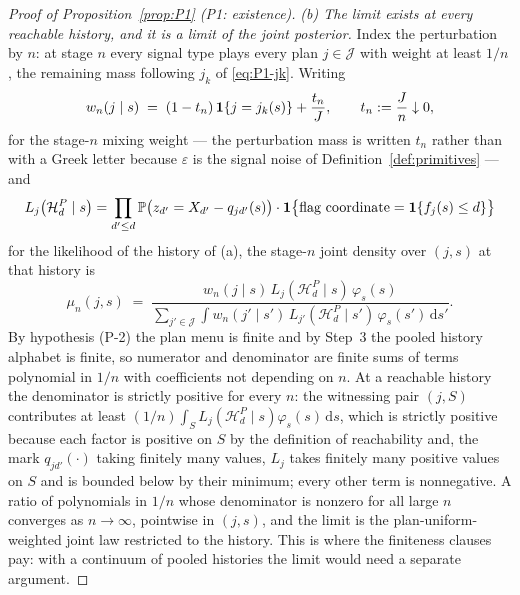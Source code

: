 \begin{proof}[Proof of Proposition~\ref{prop:P1} (P1: existence)]
\emph{(b) The limit exists at every reachable history, and it is a limit of the joint posterior.}
Index the perturbation by $n$: at stage $n$ every signal type plays every plan $j \in \mathcal J$
with weight at least $1/n$, the remaining mass following $j_k$ of \eqref{eq:P1-jk}. Writing
\begin{equation}
\label{eq:P1-wn}
w_n(j \mid s) \;=\; (1-t_n)\,\mathbf{1}\{j = j_k(s)\} + \frac{t_n}{J},
\qquad
t_n := \frac{J}{n} \downarrow 0,
\end{equation}
for the stage-$n$ mixing weight --- the perturbation mass is written $t_n$ rather than with a Greek
letter because $\varepsilon$ is the signal noise of Definition~\ref{def:primitives} --- and
\[
L_j\bigl(\mathcal H_d^P \mid s\bigr)
= \prod_{d' \le d} \mathbb{P}\bigl(z_{d'} = X_{d'}-q_{jd'}(s)\bigr)
\cdot \mathbf{1}\bigl\{\text{flag coordinate} = \mathbf{1}\{f_j(s) \le d\}\bigr\}
\]
for the likelihood of the history of (a), the stage-$n$ joint density over $(j,s)$ at that history is
\begin{equation}
\label{eq:P1-mun}
\mu_n(j,s) \;=\; \frac{w_n(j \mid s)\,L_j(\mathcal H_d^P \mid s)\,\varphi_s(s)}
{\sum_{j' \in \mathcal J} \int w_n(j' \mid s')\,L_{j'}(\mathcal H_d^P \mid s')\,\varphi_s(s')\,
\mathrm{d}s'}.
\end{equation}
By hypothesis (P-2) the plan menu is finite and by Step~3 the pooled history alphabet is finite, so
numerator and denominator are finite sums of terms polynomial in $1/n$ with coefficients not
depending on $n$. At a reachable history the denominator is strictly positive for every $n$: the
witnessing pair $(j,S)$ contributes at least $(1/n)\int_S L_j(\mathcal H_d^P \mid s)\varphi_s(s)\,
\mathrm{d}s$, which is strictly positive because each factor is positive on $S$ by the definition of
reachability and, the mark $q_{jd'}(\cdot)$ taking finitely many values, $L_j$ takes finitely many
positive values on $S$ and is bounded below by their minimum; every other term is nonnegative. A
ratio of polynomials in $1/n$ whose denominator is nonzero for all large $n$ converges as
$n \to \infty$, pointwise in $(j,s)$, and the limit is the plan-uniform-weighted joint law restricted
to the history. This is where the finiteness clauses pay: with a continuum of pooled histories the
limit would need a separate argument.


\end{proof}
